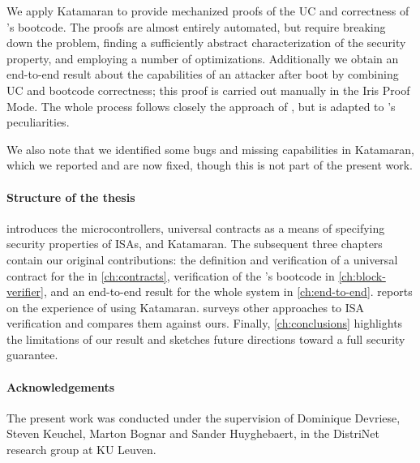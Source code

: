 We apply Katamaran to provide mechanized proofs of the UC and correctness of \msp's bootcode. The proofs are almost entirely automated, but require breaking down the problem, finding a sufficiently abstract characterization of the security property, and employing a number of optimizations. Additionally we obtain an end-to-end result about the capabilities of an attacker after boot by combining UC and bootcode correctness; this proof is carried out manually in the Iris Proof Mode. The whole process follows closely the approach of \cite{Huyghebaert2023}, but is adapted to \msp's peculiarities.

We also note that we identified some bugs and missing capabilities in Katamaran, which we reported and are now fixed, though this is not part of the present work.


\paragraph{Structure of the thesis}

 introduces the \msp microcontrollers, universal contracts as a means of specifying security properties of ISAs, and Katamaran. The subsequent three chapters contain our original contributions: the definition and verification of a universal contract for the \msp in \cref{ch:contracts}, verification of the \msp's bootcode in \cref{ch:block-verifier}, and an end-to-end result for the whole system in \cref{ch:end-to-end}.  reports on the experience of using Katamaran.  surveys other approaches to ISA verification and compares them against ours. Finally, \cref{ch:conclusions} highlights the limitations of our result and sketches future directions toward a full security guarantee.

\paragraph{Acknowledgements}

The present work was conducted under the supervision of \prof Dominique Devriese, \dr Steven Keuchel, \dr Marton Bognar and Sander Huyghebaert, in the DistriNet research group at KU Leuven.
